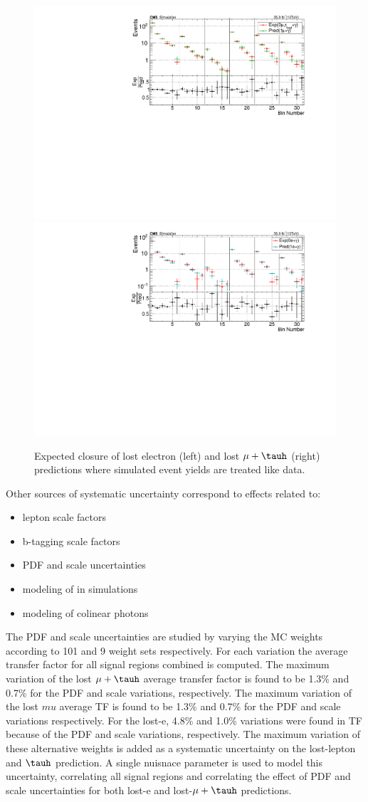 \begin{figure}
\centering
\includegraphics[width=0.48\linewidth]{../Figures/Chap3/SUSY_Photon_MET_JbJ_18Aug17/LostMu_Closure/AllSBins_v7_Mu0AllSBins_v7_Mu1.pdf}
\includegraphics[width=0.48\linewidth]{../Figures/Chap3/SUSY_Photon_MET_JbJ_18Aug17/LostEle_Closure/AllSBins_v7_Ele0AllSBins_v7_Ele1.pdf}
\captionsetup{width=.9\linewidth}
\caption{Expected closure of lost electron (left) and lost $\mu+\tauh$ (right) predictions
where simulated event yields are treated like data.}
\label{fig:lost_lepton_closure}
\end{figure}

Other sources of systematic uncertainty correspond to effects related to:
\begin{itemize}
  \item lepton scale factors
  \item b-tagging scale factors
  \item PDF and scale uncertainties
  \item modeling of \mt in simulations
  \item modeling of colinear photons 
\end{itemize}

The PDF and scale uncertainties are studied by varying the MC weights according
to 101 and 9 weight sets respectively.  For each variation the average transfer factor for
all signal regions combined is computed.  
The maximum variation of the lost $\mu+\tauh$
average transfer factor is found to be 1.3\% and 0.7\% for the PDF and scale variations, 
respectively.  
The maximum variation of the lost $mu$ average TF is found to be 1.3\% and 0.7\% for the PDF and scale variations respectively.
For the lost-e, 4.8\% and 1.0\% variations were found in TF because of the PDF and scale variations, respectively.
The maximum variation of these alternative weights is added as a systematic 
uncertainty on the lost-lepton and $\tauh$ prediction. A single nuisnace parameter
is used to model this uncertainty, correlating all signal regions and correlating
the effect of PDF and scale uncertainties for both lost-e and lost-$\mu+\tauh$
predictions. 

